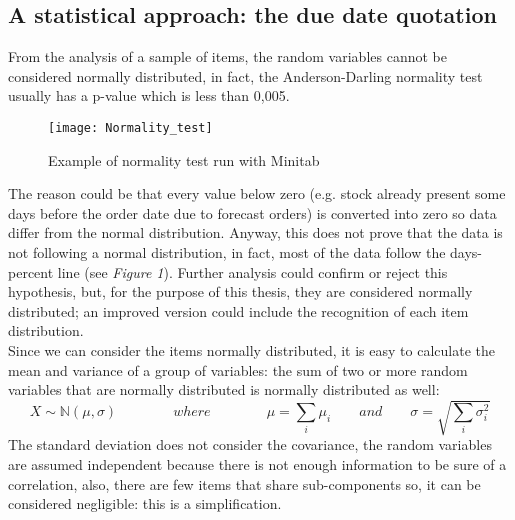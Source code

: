 \documentclass[a4paper,12pt]{article}
\begin{document}
\subsection{A statistical approach: the due date quotation}
From the analysis of a sample of items, the random variables cannot be considered normally distributed, in fact, the Anderson-Darling normality test usually has a p-value which is less than 0,005.\\
\begin{figure}[H]
	\begin{center}
		\texttt{[image: Normality\_test]}
		\caption{Example of normality test run with Minitab\textsuperscript{\textregistered}}
	\end{center}
\end{figure}
The reason could be that every value below zero (e.g. stock already present some days before the order date due to forecast orders) is converted into zero so data differ from the normal distribution. Anyway, this does not prove that the data is not following a normal distribution, in fact, most of the data follow the days-percent line (see \textit{Figure 1}). Further analysis could confirm or reject this hypothesis, but, for the purpose of this thesis, they are considered normally distributed; an improved version could include the recognition of each item distribution.\\
Since we can consider the items normally distributed, it is easy to calculate the mean and variance of a group of variables: the sum of two or more random variables that are normally distributed is normally distributed as well:
\begin{equation*}
X \sim \mathbb{N}(\mu, \sigma)		\qquad \qquad where \qquad \qquad		\mu = \sum_{i} \mu_{i} 		 \qquad and\qquad			\sigma = \sqrt{\sum_{i} \sigma_{i}^{2}}
\end{equation*}
The standard deviation does not consider the covariance, the random variables are assumed independent because there is not enough information to be sure of a correlation, also, there are few items that share sub-components so, it can be considered negligible: this is a simplification. \\
\end{document}
